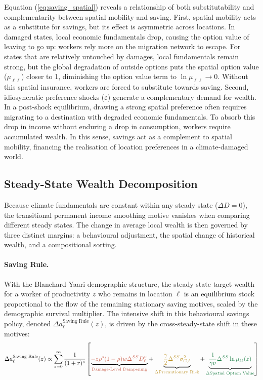 \documentclass[11pt, a4paper]{article}
\begin{document}
Equation (\ref{eq:saving_spatial}) reveals a relationship of both substitutability and complementarity between spatial mobility and saving. First, spatial mobility acts as a substitute for savings, but its effect is asymmetric across locations. In damaged states, local economic fundamentals drop, causing the option value of leaving to go up: workers rely more on the migration network to escape. For states that are relatively untouched by damages, local fundamentals remain strong, but the global degradation of outside options puts the spatial option value ($\mu_{\ell \ell}$) closer to 1, diminishing the option value term to $\ln \mu_{\ell \ell} \to 0$. Without this spatial insurance, workers are forced to substitute towards saving. Second, idiosyncratic preference shocks ($\varepsilon$) generate a complementary demand for wealth. In a post-shock equilibrium, drawing a strong spatial preference often requires migrating to a destination with degraded economic fundamentals. To absorb this drop in income without enduring a drop in consumption, workers require accumulated wealth. In this sense, savings act as a complement to spatial mobility, financing the realisation of location preferences in a climate-damaged world.

\subsection{Steady-State Wealth Decomposition}
\label{sec:wealth_decomp}
Because climate fundamentals are constant within any steady state ($\Delta D = 0$), the transitional permanent income smoothing motive vanishes when comparing different steady states. The change in average local wealth is then governed by three distinct margins: a behavioural adjustment, the spatial change of historical wealth, and a compositional sorting.
\paragraph{Saving Rule.} With the Blanchard-Yaari demographic structure, the steady-state target wealth for a worker of productivity $z$ who remains in location $\ell$ is an equilibrium stock proportional to the flow of the remaining stationary saving motives, scaled by the demographic survival multiplier. The intensive shift in this behavioural savings policy, denoted $\Delta a_\ell^{\text{Saving Rule}}(z)$, is driven by the cross-steady-state shift in these motives:
\begin{equation}
    \Delta a_\ell^{\text{Saving Rule}}(z) \propto \sum_{s=0}^{\infty} \frac{1}{(1+r)^s} \left[ \underbrace{\textcolor{terracotta}{- z \rho^s (1-\rho) w \Delta^{SS} D^w_\ell}}_{\textcolor{terracotta}{\text{Damage-Level Dampening}}} + \underbrace{\textcolor{mutedgold}{\frac{\gamma}{2} \Delta^{SS} \sigma_{C, \ell}^2}}_{\textcolor{mutedgold}{\Delta \text{Precautionary Risk}}} + \underbrace{\textcolor{emerald}{\frac{1}{\gamma \nu} \Delta^{SS} \ln \mu_{\ell \ell}(z)}}_{\textcolor{emerald}{\Delta \text{Spatial Option Value}}} \right]
    \label{eq:intensive_margin_decomposition}
\end{equation}
\end{document}
